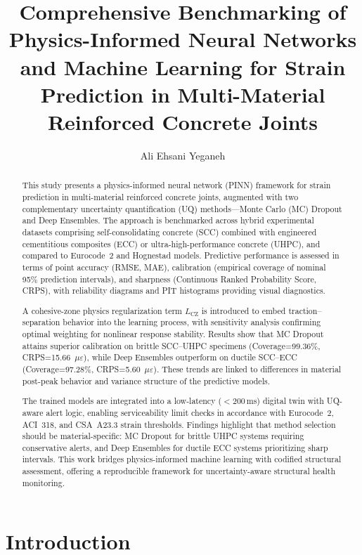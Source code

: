 \documentclass{article}
\title{Comprehensive Benchmarking of Physics-Informed Neural Networks and Machine Learning for Strain Prediction in Multi-Material Reinforced Concrete Joints}
\author[1]{Ali Ehsani Yeganeh}
\affil[1]{Department of Civil Engineering, Toronto Metropolitan University, Canada}
\date{}
\begin{document}
\maketitle


\begin{abstract}
This study presents a physics-informed neural network (PINN) framework for strain prediction in multi-material reinforced concrete joints, augmented with two complementary uncertainty quantification (UQ) methods—Monte Carlo (MC) Dropout and Deep Ensembles.  
The approach is benchmarked across hybrid experimental datasets comprising self-consolidating concrete (SCC) combined with engineered cementitious composites (ECC) or ultra-high-performance concrete (UHPC), and compared to Eurocode~2 and Hognestad models.  
Predictive performance is assessed in terms of point accuracy (RMSE, MAE), calibration (empirical coverage of nominal 95\% prediction intervals), and sharpness (Continuous Ranked Probability Score, CRPS), with reliability diagrams and PIT histograms providing visual diagnostics.  

A cohesive-zone physics regularization term $L_{\mathrm{CZ}}$ is introduced to embed traction–separation behavior into the learning process, with sensitivity analysis confirming optimal weighting for nonlinear response stability.  
Results show that MC Dropout attains superior calibration on brittle SCC--UHPC specimens (Coverage=99.36\%, CRPS=15.66~$\mu\varepsilon$), while Deep Ensembles outperform on ductile SCC--ECC (Coverage=97.28\%, CRPS=5.60~$\mu\varepsilon$).  
These trends are linked to differences in material post-peak behavior and variance structure of the predictive models.  

The trained models are integrated into a low-latency ($<200$\,ms) digital twin with UQ-aware alert logic, enabling serviceability limit checks in accordance with Eurocode~2, ACI~318, and CSA~A23.3 strain thresholds.  
Findings highlight that method selection should be material-specific: MC Dropout for brittle UHPC systems requiring conservative alerts, and Deep Ensembles for ductile ECC systems prioritizing sharp intervals.  
This work bridges physics-informed machine learning with codified structural assessment, offering a reproducible framework for uncertainty-aware structural health monitoring.
\end{abstract}



\section{Introduction}
\label{sec:introduction}
\end{document}
